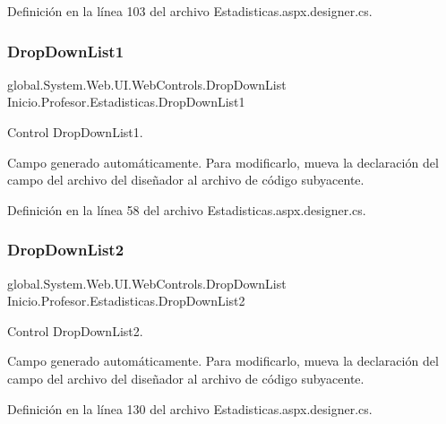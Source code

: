 Definición en la línea 103 del archivo Estadisticas.\+aspx.\+designer.\+cs.

\mbox{\label{classInicio_1_1Profesor_1_1Estadisticas_a1a8e94e528688fbde237649c62781102}} 
\subsubsection{\texorpdfstring{DropDownList1}{DropDownList1}}
{\footnotesize\ttfamily global.\+System.\+Web.\+U\+I.\+Web\+Controls.\+Drop\+Down\+List Inicio.\+Profesor.\+Estadisticas.\+Drop\+Down\+List1\hspace{0.3cm}{\ttfamily [protected]}}



Control Drop\+Down\+List1. 

Campo generado automáticamente. Para modificarlo, mueva la declaración del campo del archivo del diseñador al archivo de código subyacente. 

Definición en la línea 58 del archivo Estadisticas.\+aspx.\+designer.\+cs.

\mbox{\label{classInicio_1_1Profesor_1_1Estadisticas_a6d6788b2b0a6818271255efb0470329d}} 
\subsubsection{\texorpdfstring{DropDownList2}{DropDownList2}}
{\footnotesize\ttfamily global.\+System.\+Web.\+U\+I.\+Web\+Controls.\+Drop\+Down\+List Inicio.\+Profesor.\+Estadisticas.\+Drop\+Down\+List2\hspace{0.3cm}{\ttfamily [protected]}}



Control Drop\+Down\+List2. 

Campo generado automáticamente. Para modificarlo, mueva la declaración del campo del archivo del diseñador al archivo de código subyacente. 

Definición en la línea 130 del archivo Estadisticas.\+aspx.\+designer.\+cs.

